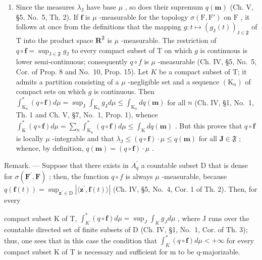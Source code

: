 \begin{enumerate}
\def\labelenumi{\alph{enumi})}
\setcounter{enumi}{1}
\tightlist
\item
  Since the measures \(\lambda_{\mathrm{J}}\) have base \(\mu\) , so does their supremum \(q(\mathbf{m})\) (Ch. V, §5, No.~5, Th. 2). If \(\mathbf{f}\) is \(\mu\) -measurable for the topology \(\sigma(\mathrm{F},\mathrm{F}')\) on \(\mathrm{F}\) , it follows at once from the definitions that the mapping \(g:t\mapsto(g_{\mathrm{J}}(t))_{\mathrm{J}\in\mathfrak{F}}\) of \(\mathrm{T}\) into the product space \(\mathbf{R}^{\mathfrak{F}}\) is \(\mu\) -measurable. The restriction of \(q\circ\mathbf{f}=\sup_{\mathrm{J}\in\mathfrak{F}}g_{\mathrm{J}}\) to every compact subset of \(\mathrm{T}\) on which \(g\) is continuous is lower semi-continuous; consequently \(q \circ f\) is \(\mu\) -measurable (Ch. IV, §5, No.~5, Cor. of Prop. 8 and No.~10, Prop. 15). Let \(K\) be a compact subset of T; it admits a partition consisting of a \(\mu\) -negligible set and a sequence \((\mathrm{K}_n)\) of compact sets on which \(g\) is continuous. Then \(\int_{\mathrm{K}_n}^*\left(q\circ \mathbf{f}\right)d\mu = \sup_{\mathrm{J}}\int_{\mathrm{K}_n}g_{\mathrm{J}}d\mu \leqslant \int_{\mathrm{K}_n}dq(\mathbf{m})\) for all \(n\) (Ch. IV, §1, No.~1, Th. 1 and Ch. V, §7, No.~1, Prop. 1), whence \(\int_{\mathrm{K}}^{*}(q\circ \mathbf{f})d\mu = \sum_{n}\int_{\mathrm{K}_n}^*\left(q\circ \mathbf{f}\right)d\mu \leqslant \int_{\mathrm{K}}dq(\mathbf{m})\) . But this proves that \(q\circ \mathbf{f}\) is locally \(\mu\) -integrable and that \(\lambda_{\mathrm{J}}\leqslant (q\circ \mathbf{f})\cdot \mu \leqslant q(\mathbf{m})\) for all \(\mathbf{J}\in \mathfrak{F}\) ; whence, by definition, \(q(\mathbf{m}) = (q\circ \mathbf{f})\cdot \mu\) .
\end{enumerate}

Remark. --- Suppose that there exists in \(A_{q}^{\prime}\) a countable subset D that is dense for \(\sigma(\mathbf{F}^{\prime},\mathbf{F})\) ; then, the function \(q\circ f\) is always \(\mu\) -measurable, because \(q(\mathbf{f}(t)) = \sup_{\mathbf{z}^{\prime}\in\mathrm{D}} |\langle\mathbf{z}^{\prime},\mathbf{f}(t)\rangle|\) (Ch. IV, §5, No.~4, Cor. 1 of Th. 2). Then, for every

compact subset K of T, \(\int_{K}^{*}(q\circ\mathbf{f})d\mu=\sup_{J}\int_{K}g_{J}d\mu\) , where J runs over the countable directed set of finite subsets of D (Ch. IV, §1, No.~1, Cor. of Th. 3); thus, one sees that in this case the condition that \(\int_{K}^{*}(q\circ\mathbf{f})d\mu<+\infty\) for every compact subset K of T is necessary and sufficient for m to be q-majorizable.

